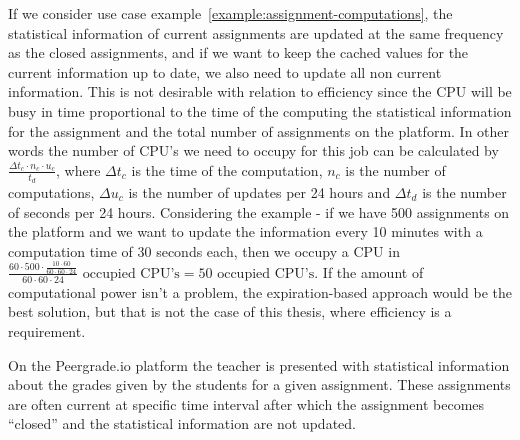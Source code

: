 If we consider use case example~\ref{example:assignment-computations}, the statistical information of current assignments are updated at the same frequency as the closed assignments, and if we want to keep the cached values for the current information up to date, we also need to update all non current information. This is not desirable with relation to efficiency since the CPU will be busy in time proportional to the time of the computing the statistical information for the assignment and the total number of assignments on the platform. In other words the number of CPU's we need to occupy for this job can be calculated by $\frac{\Delta t_c \cdot n_c \cdot u_c}{t_d}$, where $\Delta t_c$ is the time of the computation, $n_c$ is the number of computations, $\Delta u_c$ is the number of updates per 24 hours and $\Delta t_d$ is the number of seconds per 24 hours. Considering the example - if we have 500 assignments on the platform and we want to update the information every 10 minutes with a computation time of 30 seconds each, then we occupy a CPU in $\frac{60 \cdot 500 \cdot \frac{10 \cdot 60}{60 \cdot 60 \cdot 24}}{60 \cdot 60 \cdot 24}\text{ occupied CPU's} = 50\text{ occupied CPU's}$. If the amount of computational power isn't a problem, the expiration-based approach would be the best solution, but that is not the case of this thesis, where efficiency is a requirement.


\begin{example}
\label{example:assignment-computations}
On the Peergrade.io platform the teacher is presented with statistical information about the grades given by the students for a given assignment. These assignments are often current at specific time interval after which the assignment becomes ``closed'' and the statistical information are not updated.
\end{example}



